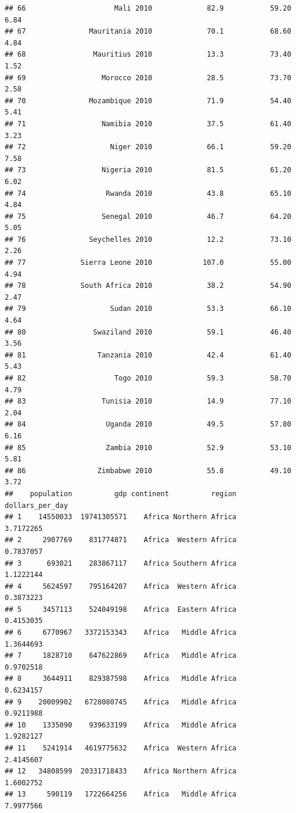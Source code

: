 \documentclass[
]{article}
\begin{document}
\begin{verbatim}
## 66                     Mali 2010             82.9           59.20      6.84
## 67               Mauritania 2010             70.1           68.60      4.84
## 68                Mauritius 2010             13.3           73.40      1.52
## 69                  Morocco 2010             28.5           73.70      2.58
## 70               Mozambique 2010             71.9           54.40      5.41
## 71                  Namibia 2010             37.5           61.40      3.23
## 72                    Niger 2010             66.1           59.20      7.58
## 73                  Nigeria 2010             81.5           61.20      6.02
## 74                   Rwanda 2010             43.8           65.10      4.84
## 75                  Senegal 2010             46.7           64.20      5.05
## 76               Seychelles 2010             12.2           73.10      2.26
## 77             Sierra Leone 2010            107.0           55.00      4.94
## 78             South Africa 2010             38.2           54.90      2.47
## 79                    Sudan 2010             53.3           66.10      4.64
## 80                Swaziland 2010             59.1           46.40      3.56
## 81                 Tanzania 2010             42.4           61.40      5.43
## 82                     Togo 2010             59.3           58.70      4.79
## 83                  Tunisia 2010             14.9           77.10      2.04
## 84                   Uganda 2010             49.5           57.80      6.16
## 85                   Zambia 2010             52.9           53.10      5.81
## 86                 Zimbabwe 2010             55.8           49.10      3.72
##    population          gdp continent          region dollars_per_day
## 1    14550033  19741305571    Africa Northern Africa       3.7172265
## 2     2907769    831774871    Africa  Western Africa       0.7837057
## 3      693021    283867117    Africa Southern Africa       1.1222144
## 4     5624597    795164207    Africa  Western Africa       0.3873223
## 5     3457113    524049198    Africa  Eastern Africa       0.4153035
## 6     6770967   3372153343    Africa   Middle Africa       1.3644693
## 7     1828710    647622869    Africa   Middle Africa       0.9702518
## 8     3644911    829387598    Africa   Middle Africa       0.6234157
## 9    20009902   6728080745    Africa   Middle Africa       0.9211988
## 10    1335090    939633199    Africa   Middle Africa       1.9282127
## 11    5241914   4619775632    Africa  Western Africa       2.4145607
## 12   34808599  20331718433    Africa Northern Africa       1.6002752
## 13     590119   1722664256    Africa   Middle Africa       7.9977566

\end{verbatim}
\end{document}
